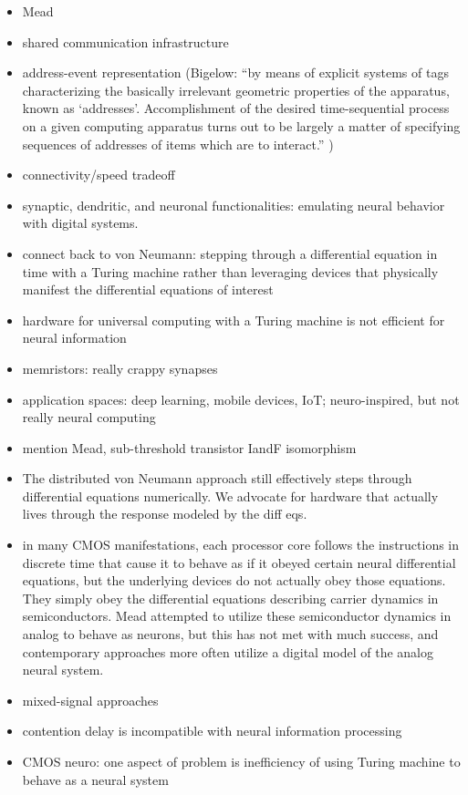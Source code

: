 \documentclass[twocolumn]{article}
\begin{document}
\begin{itemize}
\item Mead
\item shared communication infrastructure
\item address-event representation (Bigelow: ``by means of explicit systems of tags characterizing the basically irrelevant geometric properties of the apparatus, known as `addresses'. Accomplishment of the desired time-sequential process on a given computing apparatus turns out to be largely a matter of specifying sequences of addresses of items which are to interact.'' \cite{bi1955})
\item connectivity/speed tradeoff
\item synaptic, dendritic, and neuronal functionalities: emulating neural behavior with digital systems.
\item connect back to von Neumann: stepping through a differential equation in time with a Turing machine rather than leveraging devices that physically manifest the differential equations of interest
\item hardware for universal computing with a Turing machine is not efficient for neural information
\item memristors: really crappy synapses
\item application spaces: deep learning, mobile devices, IoT; neuro-inspired, but not really neural computing
\item mention Mead, sub-threshold transistor IandF isomorphism
\item The distributed von Neumann approach still effectively steps through differential equations numerically. We advocate for hardware that actually lives through the response modeled by the diff eqs. 
\item in many CMOS manifestations, each processor core follows the instructions in discrete time that cause it to behave as if it obeyed certain neural differential equations, but the underlying devices do not actually obey those equations. They simply obey the differential equations describing carrier dynamics in semiconductors. Mead attempted to utilize these semiconductor dynamics in analog to behave as neurons, but this has not met with much success, and contemporary approaches more often utilize a digital model of the analog neural system.
\item mixed-signal approaches
\item contention delay is incompatible with neural information processing
\item CMOS neuro: one aspect of problem is inefficiency of using Turing machine to behave as a neural system
\end{itemize}
\end{document}
